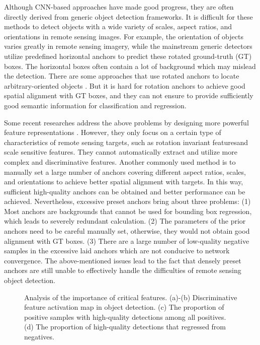 \documentclass[journal]{IEEEtran}
\begin{document}
Although CNN-based approaches have made good progress, they are often directly derived from generic object detection frameworks. It is difficult for these methods to detect objects with a wide variety of scales, aspect ratios, and orientations in remote sensing images. For example, the orientation of objects varies greatly  in remote sensing imagery, while the mainstream generic detectors utilize predefined horizontal anchors to predict these rotated ground-truth (GT) boxes. The horizontal boxes often contain a lot of background which may mislead the detection. There are some approaches that use rotated anchors to locate arbitrary-oriented objects \cite{liu2018arbitrary, zhang2018toward, liu2017rotated, ding2019learning, li2020novel, liao2018rotation, fu2020rotation}. But it is hard for rotation anchors to achieve good spatial alignment with GT boxes, and they can not ensure to provide sufficiently good semantic information for classification and regression. 

Some recent researches address the above problems by designing more powerful feature representations \cite{cheng2016learning, zhou2017oriented, deng2018multi, wang2019fmssd, fu2020rotation, liao2018rotation}. However, they only focus on a certain type of characteristics of remote sensing targets, such as rotation invariant features\cite{cheng2016learning, zhou2017oriented}and scale sensitive features\cite{deng2018multi, wang2019fmssd}. They cannot automatically extract and utilize more complex and discriminative features. Another commonly used method is to manually set a large number of anchors covering different aspect ratios, scales, and orientations to achieve better spatial alignment with targets. In this way, sufficient high-quality anchors can be obtained and better performance can be achieved. Nevertheless, excessive preset anchors bring about three problems: (1) Most anchors are backgrounds that cannot be used for bounding box regression, which leads to severely redundant calculation. (2) The parameters of the prior anchors need to be careful manually set, otherwise, they would not obtain good alignment with GT boxes. (3) There are a large number of low-quality negative samples in the excessive laid anchors which are not conducive to network convergence. The above-mentioned issues lead to the fact that densely preset anchors are still unable to effectively handle the difficulties of remote sensing object detection.


\begin{figure}[t]
	\centering
	\hspace{0mm}
	\quad

	\hspace{0mm}
	\quad
	\caption{Analysis of the importance of critical features. (a)-(b) Discriminative feature activation map in object detection. (c) The proportion of positive samples with high-quality detections among all positives. (d) The proportion of high-quality detections that regressed from negatives.}
	\label{Fig2}
\end{figure}
\end{document}
